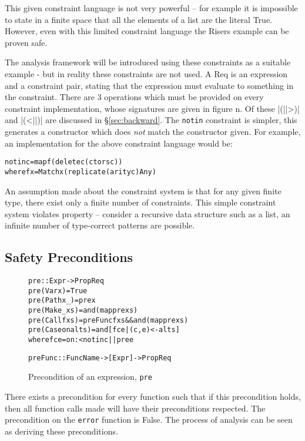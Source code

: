 \documentclass[preprint]{sigplanconf}
\newcommand{\T}[1]{\texttt{#1}}
\newenvironment{code}{\begin{alltt}\small}{\end{alltt}}
\begin{document}
This given constraint language is not very powerful -- for example it is impossible to state in a finite space that all the elements of a list are the literal True. However, even with this limited constraint language the Risers example can be proven safe.

The analysis framework will be introduced using these constraints as a suitable example - but in  reality these constraints are not used. A Req is an expression and a constraint pair, stating that the expression must evaluate to something in the constraint. There are 3 operations which must be provided on every constraint implementation, whose signatures are given in figure n. Of these |(||>)| and |(<||)| are discussed in \S\ref{sec:backward}. The \T{notin} constraint is simpler, this generates a constructor which does \textit{not} match the constructor given. For example, an implementation for the above constraint language would be:

\begin{code}
notin c = map f (delete c (ctors c))
   where f x = Match x (replicate (arity c) Any)
\end{code}

An assumption made about the constraint system is that for any given finite type, there exist only a finite number of constraints. This simple constraint system violates property -- consider a recursive data structure such as a list, an infinite number of type-correct patterns are possible.

\subsection{Safety Preconditions}

\begin{figure}
\begin{code}
pre :: Expr -> Prop Req
pre (Var x         ) = True
pre (Path x _      ) = pre x
pre (Make _ xs     ) = and (map pre xs)
pre (Call f xs     ) = preFunc f xs && and (map pre xs)
pre (Case on alts  ) = and [f c e | (c,e) <- alts]
    where f c e = on :< notin c || pre e

preFunc :: FuncName -> [Expr] -> Prop Req
\end{code}
\caption{Precondition of an expression, \T{pre}}
\label{fig:precondition}
\end{figure}

There exists a precondition for every function such that if this precondition holds, then all function calls made will have their preconditions respected. The precondition on the \T{error} function is False. The process of analysis can be seen as deriving these preconditions.
\end{document}
